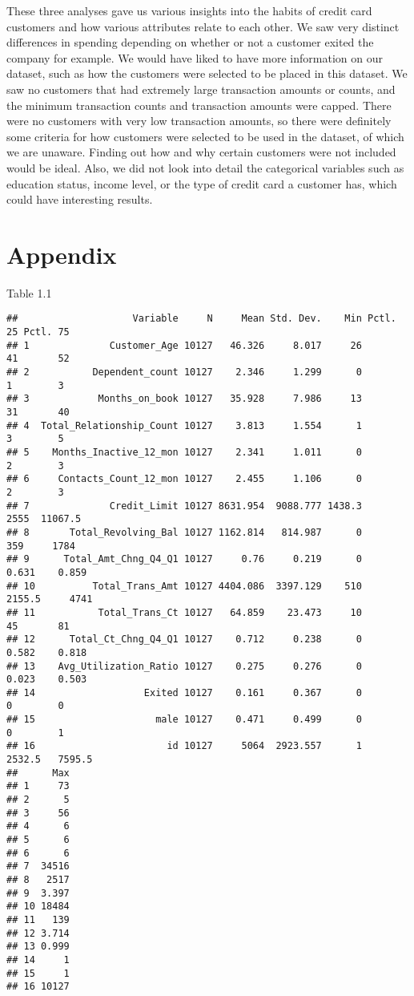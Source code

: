 \documentclass[
]{article}
\begin{document}
These three analyses gave us various insights into the habits of credit
card customers and how various attributes relate to each other. We saw
very distinct differences in spending depending on whether or not a
customer exited the company for example. We would have liked to have
more information on our dataset, such as how the customers were selected
to be placed in this dataset. We saw no customers that had extremely
large transaction amounts or counts, and the minimum transaction counts
and transaction amounts were capped. There were no customers with very
low transaction amounts, so there were definitely some criteria for how
customers were selected to be used in the dataset, of which we are
unaware. Finding out how and why certain customers were not included
would be ideal. Also, we did not look into detail the categorical
variables such as education status, income level, or the type of credit
card a customer has, which could have interesting results.

\hypertarget{appendix}{%
\section{Appendix}\label{appendix}}

Table 1.1

\begin{verbatim}
##                    Variable     N     Mean Std. Dev.    Min Pctl. 25 Pctl. 75
## 1              Customer_Age 10127   46.326     8.017     26       41       52
## 2           Dependent_count 10127    2.346     1.299      0        1        3
## 3            Months_on_book 10127   35.928     7.986     13       31       40
## 4  Total_Relationship_Count 10127    3.813     1.554      1        3        5
## 5    Months_Inactive_12_mon 10127    2.341     1.011      0        2        3
## 6     Contacts_Count_12_mon 10127    2.455     1.106      0        2        3
## 7              Credit_Limit 10127 8631.954  9088.777 1438.3     2555  11067.5
## 8       Total_Revolving_Bal 10127 1162.814   814.987      0      359     1784
## 9      Total_Amt_Chng_Q4_Q1 10127     0.76     0.219      0    0.631    0.859
## 10          Total_Trans_Amt 10127 4404.086  3397.129    510   2155.5     4741
## 11           Total_Trans_Ct 10127   64.859    23.473     10       45       81
## 12      Total_Ct_Chng_Q4_Q1 10127    0.712     0.238      0    0.582    0.818
## 13    Avg_Utilization_Ratio 10127    0.275     0.276      0    0.023    0.503
## 14                   Exited 10127    0.161     0.367      0        0        0
## 15                     male 10127    0.471     0.499      0        0        1
## 16                       id 10127     5064  2923.557      1   2532.5   7595.5
##      Max
## 1     73
## 2      5
## 3     56
## 4      6
## 5      6
## 6      6
## 7  34516
## 8   2517
## 9  3.397
## 10 18484
## 11   139
## 12 3.714
## 13 0.999
## 14     1
## 15     1
## 16 10127
\end{verbatim}
\end{document}
